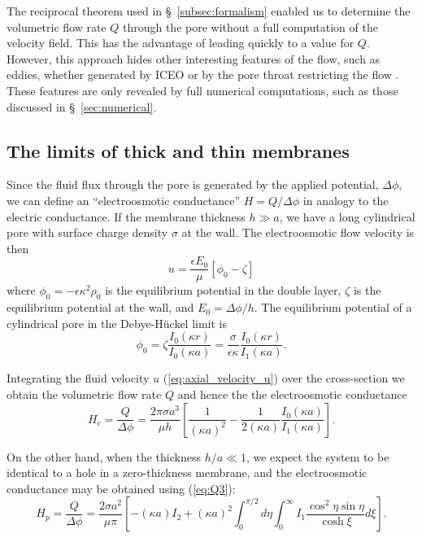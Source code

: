 The reciprocal theorem used in \S~\ref{subsec:formalism} enabled
us to determine the volumetric flow rate $Q$ through the pore without a full computation of the velocity field. This has the advantage of leading quickly to a value for $Q$. However, this approach hides other interesting features of the flow, such as eddies, whether generated by ICEO \cite{Thamida2002} or by the pore throat restricting the flow \cite{park2006eddies}. These features are only revealed by full numerical computations, such as those discussed in \S~\ref{sec:numerical}.


\subsection{The limits of thick and thin membranes} 
Since the fluid flux through the pore is generated by the applied potential, $\Delta \phi$,
we can define an ``electroosmotic conductance'' $H = Q/\Delta\phi$ in analogy to the electric conductance. If the membrane thickness  $h \gg a$, we have a long cylindrical pore with surface charge density $\sigma$ at the wall. 
The electroosmotic flow velocity is then \cite{levine1975}
\begin{equation}
u = \frac{\epsilon E_0}{\mu} [\phi_0 - \zeta]
\label{eq:axial_velocity_u}
\end{equation} 
where $\phi_0=-\epsilon\kappa^2\rho_0$ is the equilibrium potential in the double layer, $\zeta$ is the equilibrium potential at the wall, and $E_0 = \Delta\phi / h$. The equilibrium potential of a cylindrical pore in the Debye-H\"{u}ckel limit is
\begin{equation}
\phi_0 = \zeta \frac{I_0(\kappa r)}{I_0(\kappa a)}
= \frac{\sigma}{\epsilon\kappa} \frac{I_0(\kappa r)}{I_1(\kappa a)}.
\end{equation} 

Integrating the fluid velocity $u$ (\ref{eq:axial_velocity_u}) over the cross-section we obtain the volumetric flow rate $Q$ and hence the the electroosmotic conductance \cite{rice1965}
\begin{equation}
H_c = \frac{Q}{\Delta\phi} = \frac{2\pi\sigma a^3}{\mu h} \left[
\frac{1}{(\kappa a)^2} - \frac{1}{2(\kappa a)} \frac{I_0(\kappa
a)}{I_1(\kappa a)} \right].
\label{eq:Hc}
\end{equation}

On the other hand, when the thickness $h/a \ll  1$, we expect the system to be identical to a hole in a zero-thickness membrane, and the electroosmotic conductance may be obtained using (\ref{eq:Q3}):
\begin{equation}
H_p = \frac{Q}{\Delta\phi} =
\frac{2 \sigma a^2}{\mu\pi} \left[ - (\kappa a)
I_2 + (\kappa a)^2 \int_0^{\pi/2} d\eta \int_0^\infty I_1
\frac{\cos^2\eta\sin\eta}{\cosh\xi} d\xi \right].
\label{eq:Hp}
\end{equation} 

